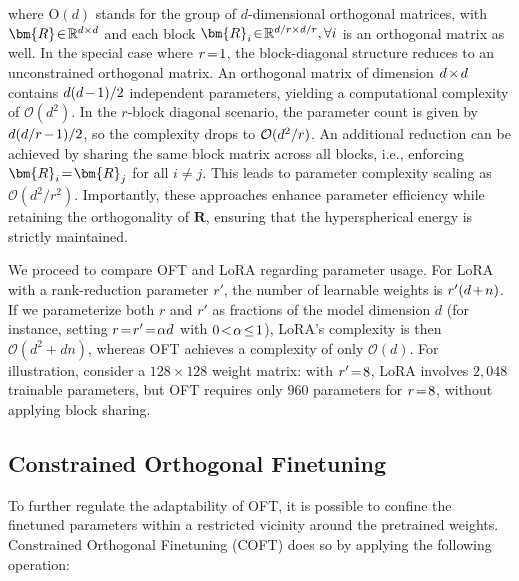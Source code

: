 where $\text{O}(d)$ stands for the group of $d$-dimensional orthogonal matrices, with $\thickmuskip=2mu \medmuskip=2mu \bm{R}\in\mathbb{R}^{d\times d}$ and each block $\thickmuskip=2mu \medmuskip=2mu \bm{R}_i\in\mathbb{R}^{d/r\times d/r},\forall i$ is an orthogonal matrix as well. In the special case where $\thickmuskip=2mu \medmuskip=2mu r=1$, the block-diagonal structure reduces to an unconstrained orthogonal matrix. An orthogonal matrix of dimension $\thickmuskip=2mu \medmuskip=2mu d\times d$ contains $\thickmuskip=2mu \medmuskip=2mu d(d-1)/2$ independent parameters, yielding a computational complexity of $\mathcal{O}(d^2)$. In the $r$-block diagonal scenario, the parameter count is given by $\thickmuskip=2mu \medmuskip=2mu d(d/r-1)/2$, so the complexity drops to $\thickmuskip=2mu \medmuskip=2mu \mathcal{O}(d^2/r)$. An additional reduction can be achieved by sharing the same block matrix across all blocks, i.e., enforcing $\thickmuskip=2mu \medmuskip=2mu\bm{R}_i=\bm{R}_j$ for all $i\neq j$. This leads to parameter complexity scaling as $\mathcal{O}(d^2/r^2)$. Importantly, these approaches enhance parameter efficiency while retaining the orthogonality of $\bm{R}$, ensuring that the hyperspherical energy is strictly maintained.

We proceed to compare OFT and LoRA regarding parameter usage. For LoRA with a rank-reduction parameter $r'$, the number of learnable weights is $\thickmuskip=2mu \medmuskip=2mu r'(d+n)$. If we parameterize both $r$ and $r'$ as fractions of the model dimension $d$ (for instance, setting $\thickmuskip=2mu \medmuskip=2mu r=r'=\alpha d$ with $\thickmuskip=2mu \medmuskip=2mu 0<\alpha\leq 1$), LoRA’s complexity is then $\mathcal{O}(d^2+dn)$, whereas OFT achieves a complexity of only $\mathcal{O}(d)$. For illustration, consider a $128\times128$ weight matrix: with $\thickmuskip=2mu \medmuskip=2mu r'=8$, LoRA involves $2,048$ trainable parameters, but OFT requires only $960$ parameters for $\thickmuskip=2mu \medmuskip=2mu r=8$, without applying block sharing.

\subsection{Constrained Orthogonal Finetuning}

To further regulate the adaptability of OFT, it is possible to confine the finetuned parameters within a restricted vicinity around the pretrained weights. Constrained Orthogonal Finetuning (COFT) does so by applying the following operation:

